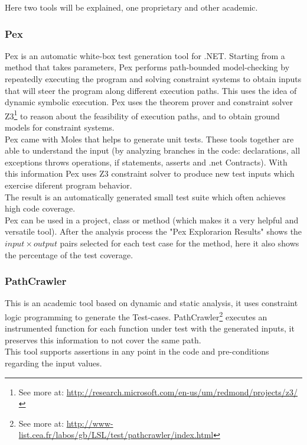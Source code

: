 \documentclass[a4paper,UKenglish]{oasics}
\begin{document}
Here two tools will be explained, one proprietary and other academic.

\subsubsection{Pex} Pex\cite{Tillmann:2008:PWB:1792786.1792798} is an automatic white-box test generation tool for .NET. Starting from a
method that takes parameters, Pex performs path-bounded model-checking
by repeatedly executing the program and solving constraint systems to obtain inputs that will steer the program along different execution paths.
This uses the idea of dynamic symbolic execution\cite{Tillmann06unittests}. Pex uses the theorem prover and
constraint solver Z3\footnote{See more at: \url{http://research.microsoft.com/en-us/um/redmond/projects/z3/}} to reason about the feasibility of execution paths, and
to obtain ground models for constraint systems.\\
Pex came with Moles that helps to generate unit tests. These tools together are able to understand the input (by analyzing branches in the code:
declarations, all exceptions throws operations, if statements, asserts and .net Contracts). With this information Pex uses Z3 constraint solver to
produce new test inputs which exercise diferent program behavior.\\
The result is an automatically generated small test suite which often achieves high code coverage.\\
Pex can be used in a project, class or method (which makes it a very helpful and versatile tool). After the analysis process the "Pex Explorarion Results" shows
the $input \times output$ pairs selected for each test case for the method, here it also shows the percentage of the test coverage.

\subsubsection{PathCrawler} This is an academic tool based on dynamic and static analysis\cite{Williams05pathcrawler:automatic}, 
it uses constraint logic programming to generate the Test-cases. PathCrawler\footnote{See more at: \url{http://www-list.cea.fr/labos/gb/LSL/test/pathcrawler/index.html}} executes an instrumented function for each function under test
with the generated inputs, it preserves this information to not cover the same path.\\
This tool supports assertions in any point in the code and pre-conditions regarding the input values.
\end{document}
